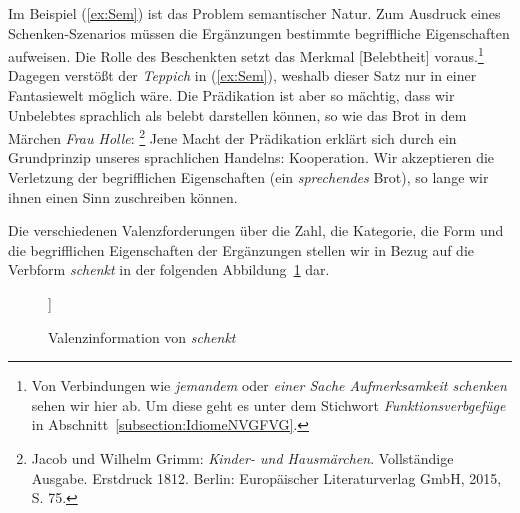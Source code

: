 Im Beispiel (\ref{ex:Sem}) ist das Problem semantischer Natur. Zum Ausdruck eines Schenken-Szenarios müssen die Ergänzungen bestimmte begriffliche Eigenschaften aufweisen. Die Rolle des Beschenkten setzt das Merkmal [Belebtheit] voraus.\footnote{Von Verbindungen wie \textit{jemandem} oder \textit{einer Sache Aufmerksamkeit schenken} sehen wir hier ab. Um diese geht es unter dem Stichwort \textit{Funktionsverbgefüge} in Abschnitt~\ref{subsection:IdiomeNVGFVG}.} Dagegen verstößt der \textit{Teppich} in (\ref{ex:Sem}), weshalb dieser Satz nur in einer Fantasiewelt möglich wäre. Die Prädikation ist aber so mächtig, dass wir Unbelebtes sprachlich als belebt darstellen können, so wie das Brot in dem Märchen \textit{Frau Holle}: \footnote{Jacob und Wilhelm Grimm: \textit{Kinder- und Hausmärchen}. Vollständige Ausgabe. Erstdruck 1812. Berlin: Europäischer Literaturverlag GmbH, 2015, S. 75.} Jene Macht der Prädikation erklärt sich durch ein Grundprinzip unseres sprachlichen Handelns: Kooperation. Wir akzeptieren die Verletzung der begrifflichen Eigenschaften (ein \textit{sprechendes} Brot), so lange wir ihnen einen Sinn zuschreiben können.

Die verschiedenen Valenzforderungen über die Zahl, die Kategorie, die Form und die begrifflichen Eigenschaften der Ergänzungen stellen wir in Bezug auf die Verbform \textit{schenkt} in der folgenden Abbildung~\ref{caption:Valenzschenkt} dar. 


\begin{figure}
	\begin{forest}
		[schenkt [1{.} Ergänzung\\NP\\Nominativ\\Schenkender\\typ{.} menschlich] [2{.} Ergänzung\\NP\\Dativ\\Beschenkter\\typ{.} belebt] [3{.} Ergänzung\\NP\\Akkusativ\\Geschenk\\typ. nicht menschlich]]
	\end{forest}
	\caption{Valenzinformation von \textit{schenkt}}\label{caption:Valenzschenkt}
\end{figure}


